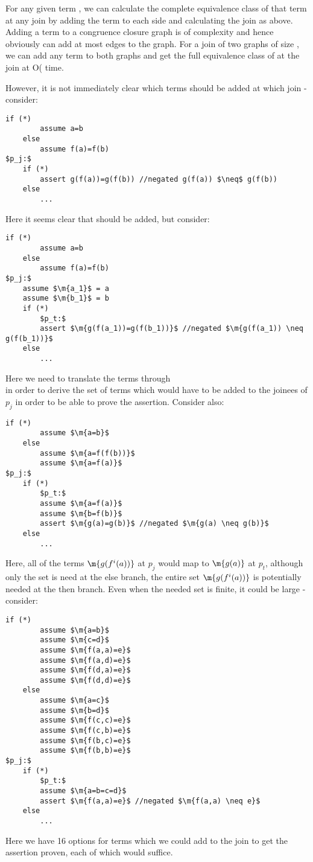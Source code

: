 For any given term , we can calculate the complete equivalence class of that term at any join by adding the term to each side and calculating the join as above.
Adding a term  to a congruence closure graph is of complexity  and hence obviously can add at most  edges to the graph.
For a join of two graphs of size , we can add any term  to both graphs and get the full equivalence class of  at the join at O( time.

However, it is not immediately clear which terms should be added at which join - consider:
\begin{lstlisting}[caption={join indirect congruence closure},label=snippet3.7]
	if (*)
		assume a=b
	else
		assume f(a)=f(b)
$p_j:$
	if (*)
		assert g(f(a))=g(f(b)) //negated g(f(a)) $\neq$ g(f(b))
	else
		...
\end{lstlisting}

Here it seems clear that  should be added, but consider:
\begin{lstlisting}[caption={join indirect congruence closure DSA},label=snippet3.8]
	if (*)
		assume a=b
	else
		assume f(a)=f(b)
$p_j:$
	assume $\m{a_1}$ = a
	assume $\m{b_1}$ = b
	if (*)
		$p_t:$
		assert $\m{g(f(a_1))=g(f(b_1))}$ //negated $\m{g(f(a_1)) \neq g(f(b_1))}$
	else
		...
\end{lstlisting}

Here we need to translate the terms  through \\
  in order to derive the set of terms which would have to be added to the joinees of $p_j$ in order to be able to prove the assertion.
Consider also:
\begin{lstlisting}[caption={join indirect congruence closure loop},label=snippet3.9]
	if (*)
		assume $\m{a=b}$
	else
		assume $\m{a=f(f(b))}$
		assume $\m{a=f(a)}$
$p_j:$
	if (*)
		$p_t:$
		assume $\m{a=f(a)}$
		assume $\m{b=f(b)}$
		assert $\m{g(a)=g(b)}$ //negated $\m{g(a) \neq g(b)}$
	else
		...
\end{lstlisting}

Here, all of the terms $\m{g(f^i(a))}$ at $p_j$ would map to $\m{g(a)}$ at $p_t$, although only the set  is need at the else branch, the entire set $\m{g(f^i(a))}$ is potentially needed at the then branch.
Even when the needed set is finite, it could be large - consider:
\begin{lstlisting}[caption=congruence closure source quadratic,label=snippet3.10]
	if (*)
		assume $\m{a=b}$
		assume $\m{c=d}$
		assume $\m{f(a,a)=e}$
		assume $\m{f(a,d)=e}$
		assume $\m{f(d,a)=e}$
		assume $\m{f(d,d)=e}$
	else
		assume $\m{a=c}$
		assume $\m{b=d}$
		assume $\m{f(c,c)=e}$
		assume $\m{f(c,b)=e}$
		assume $\m{f(b,c)=e}$
		assume $\m{f(b,b)=e}$
$p_j:$
	if (*)
		$p_t:$
		assume $\m{a=b=c=d}$
		assert $\m{f(a,a)=e}$ //negated $\m{f(a,a) \neq e}$
	else
		...
\end{lstlisting}
Here we have 16 options for terms which we could add to the join to get the assertion proven, each of which would suffice.

